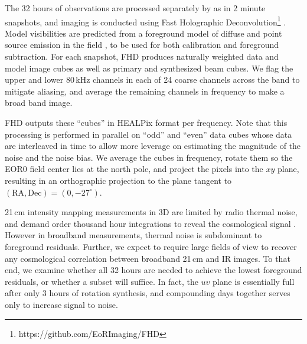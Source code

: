 \documentclass{emulateapj}
\begin{document}
The 32 hours of observations are processed separately by \citet{beardsley16} as in 2 minute snapshots, and imaging is conducted using Fast Holographic Deconvolution\footnote{https://github.com/EoRImaging/FHD} \citep{fhd}. Model visibilities are predicted from a foreground model of diffuse and point source emission in the field \citep{beardsley16,PattiCatalog1}, to be used for both calibration and foreground subtraction. For each snapshot, FHD produces naturally weighted data and model image cubes as well as primary and synthesized beam cubes. We flag the upper and lower 80\,kHz channels in each of 24 coarse channels across the band to mitigate aliasing, and average the remaining channels in frequency to make a broad band image. 

FHD outputs these ``cubes'' in HEALPix format per frequency. Note that this processing is performed in parallel on ``odd'' and ``even'' data cubes whose data are interleaved in time to allow more leverage on estimating the magnitude of the noise and the noise bias. We average the cubes in frequency, rotate them so the EOR0 field center lies at the north pole, and project the pixels into the $xy$ plane, resulting in an orthographic projection to the plane tangent to  $(\text{RA}, \text{Dec})=(0,-27^\circ)$.

21\,cm intensity mapping measurements in 3D are limited by radio thermal noise, and demand order thousand hour integrations to reveal the cosmological signal \citep{beardsley13,PoberNextGen}. However in broadband measurements, thermal noise is subdominant to foreground residuals. Further, we expect to require large fields of view to recover any cosmological correlation between broadband 21\,cm and IR images. To that end, we examine whether all 32 hours are needed to achieve the lowest foreground residuals, or whether a subset will suffice. In fact, the $uv$ plane is essentially full after only 3 hours of rotation synthesis, and compounding days together serves only to increase signal to noise. 
\end{document}
